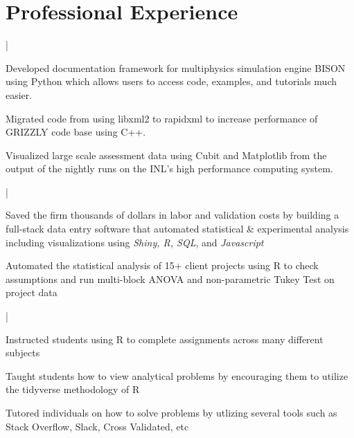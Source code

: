 \documentclass[letterpaper]{deedy-resume}
\begin{document}
\begin{minipage}[t]{0.65\textwidth} 
\section{Professional Experience}

 |
\vspace{\topsep} 
\begin{tightitemize}
  \item Developed documentation framework for multiphysics simulation engine BISON using Python which allows users to access code, examples, and tutorials much easier. \\
  \item Migrated code from using libxml2 to rapidxml to increase performance of GRIZZLY code base using C++.  \\
  \item Visualized large scale assessment data using Cubit and Matplotlib from the output of the nightly runs on the INL's high performance computing system. \\
\end{tightitemize}

\sectionspace 

 |
\begin{tightitemize}
  \item Saved the firm thousands of dollars in labor and validation costs by building a full-stack data entry software that automated statistical \& experimental analysis including visualizations using \textit{Shiny, R, SQL}, and \textit{Javascript} \\
  \item Automated the statistical analysis of 15+ client projects using R to check assumptions and run multi-block ANOVA and non-parametric Tukey Test on project data  \\
\end{tightitemize}

\sectionspace 

 |
\begin{tightitemize}
  \item Instructed students using R to complete assignments across many different subjects \\
  \item Taught students how to view analytical problems by encouraging them to utilize the tidyverse methodology of R \\
  \item Tutored individuals on how to solve problems by utlizing several tools such as Stack Overflow, Slack, Cross Validated, etc
\end{tightitemize}


\end{minipage}
\end{document}
